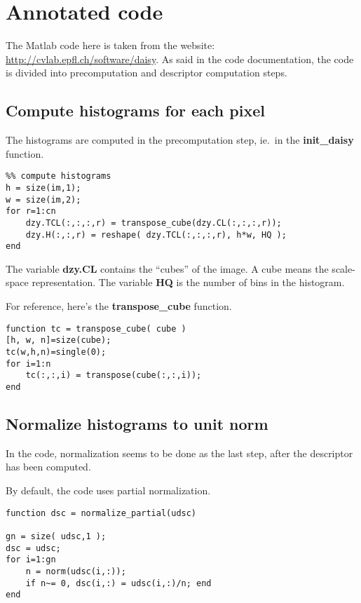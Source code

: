 
\section{Annotated code}

The Matlab code here is taken from the website: \url{http://cvlab.epfl.ch/software/daisy}.
As said in the code documentation, the code is divided into precomputation and
descriptor computation steps.

\subsection{Compute histograms for each pixel}

The histograms are computed in the precomputation step, ie.\ in the
\textbf{init\_daisy} function.

\begin{lstlisting}
%% compute histograms
h = size(im,1);
w = size(im,2);
for r=1:cn
    dzy.TCL(:,:,:,r) = transpose_cube(dzy.CL(:,:,:,r));
    dzy.H(:,:,r) = reshape( dzy.TCL(:,:,:,r), h*w, HQ );
end
\end{lstlisting}

The variable \textbf{dzy.CL} contains the ``cubes'' of the image. A cube means
the scale-space representation. The variable \textbf{HQ} is the number of bins
in the histogram.

For reference, here's the \textbf{transpose\_cube} function.
\begin{lstlisting}
function tc = transpose_cube( cube )
[h, w, n]=size(cube);
tc(w,h,n)=single(0);
for i=1:n
    tc(:,:,i) = transpose(cube(:,:,i));
end
\end{lstlisting}

\subsection{Normalize histograms to unit norm}

In the code, normalization seems to be done as the last step, after the
descriptor has been computed.

By default, the code uses partial normalization.
\begin{lstlisting}
function dsc = normalize_partial(udsc)

gn = size( udsc,1 );
dsc = udsc;
for i=1:gn
    n = norm(udsc(i,:));
    if n~= 0, dsc(i,:) = udsc(i,:)/n; end
end
\end{lstlisting}


